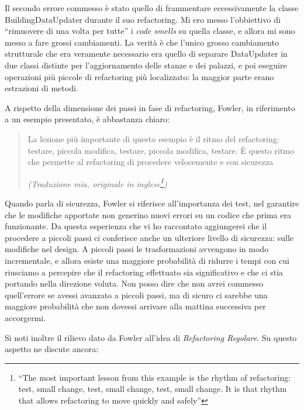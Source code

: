\documentclass[12pt]{report}
\begin{document}
Il secondo errore commesso è stato quello di frammentare eccessivamente la
classe BuildingDataUpdater durante il suo refactoring. Mi ero messo l'obbiettivo
di ``rimuovere di una volta per tutte'' i \textit{code smells} su quella classe,
e allora mi sono messo a fare grossi cambiamenti. La verità è che l'unico
grosso cambiamento strutturale che era veramente necessario era quello di separare
DataUpdater in due classi distinte per l'aggiornamento delle stanze e dei 
palazzi, e poi eseguire operazioni più piccole di refactoring più localizzato:
la maggior parte erano estrazioni di metodi.

A rispetto della dimensione dei passi in fase di refactoring, Fowler, in
riferimento a un esempio presentato, è abbastanza chiaro:

\begin{quote}
La lezione più importante di questo esempio è il ritmo del refactoring:
testare, piccola modifica, testare, piccola modifica, testare. È questo
ritmo che permette al refactoring di procedere velocemente
e con sicurezza\cite{fowler2002}

\flushright\textit{(Traduzione mia, originale in inglese\footnote{
``The most important lesson from this example is the rhythm of refactoring:
test, small change, test, small change, test, small change. It is that
rhythm that allows refactoring to move quickly and safely''
})
}
\end{quote}

Quando parla di sicurezza, Fowler si riferisce all'importanza dei test,
nel garantire che le modifiche apportate non generino nuovi errori
su un codice che prima era funzionante. Da questa esperienza che vi ho
raccontato aggiungerei che il procedere a piccoli passi ci conferisce
anche un ulteriore livello di sicurezza: sulle modifiche nel design. 
A piccoli passi le trasformazioni avvengono in modo incrementale,
e allora esiste una maggiore probabilità di ridurre i tempi con cui 
riusciamo a percepire che il refactoring effettuato sia significativo 
e che ci stia portando nella direzione voluta.
Non posso dire che non avrei commesso quell'errore se avessi avanzato
a piccoli passi, ma di sicuro ci sarebbe una maggiore probabilità che
non dovessi arrivare alla mattina successiva per accorgermi.

Si noti inoltre il rilievo dato da Fowler all'idea di 
\textit{Refactoring Regolare}. Su questo aspetto ne discute
ancora:
\end{document}
